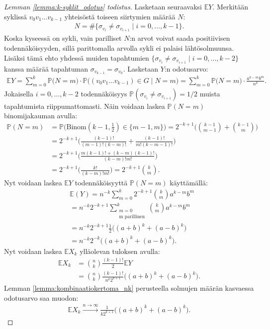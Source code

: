 \documentclass[finnish,12pt,a4paper,pdftex,sci,utf8]{aaltothesis}
\begin{document}
\begin{proof}[Lemman \ref{lemma:k-syklit_odotus} todistus]
	Lasketaan seuraavaksi $\mathbb{E} Y$. Merkitään syklissä $v_0 v_1 \ldots v_{k-1}$ yhteisöstä toiseen siirtymien määrää $N$:
	\begin{align*}
		N = \#\{\sigma_{v_i} \neq \sigma_{v_{i+1}} \mid i = 0, \ldots, k-1 \}.
	\end{align*}
	Koska kyseessä on sykli, vain parilliset $N$:n arvot voivat saada positiivisen todennäköisyyden, sillä parittomalla arvolla sykli ei palaisi lähtösolmuunsa. Lisäksi tämä ehto yhdessä muiden tapahtumien $\{\sigma_{v_i} \neq \sigma_{v_{i+1}} \mid i = 0, \ldots, k-2\}$ kanssa määrää tapahtuman $\sigma_{v_{k-1}} = \sigma_{v_0}$.
	Lasketaan $Y$:n odotusarvo:
	\begin{align*}
		\mathbb{E}Y = \sum^{k}_{m=0}\mathbb{P}\big(N=m\big) \cdot \mathbb{P}\big((v_0 v_1 \ldots v_{k-1}) \in G \mid N=m\big)
		= \sum^{k}_{m=0}\mathbb{P}\big(N=m\big) \cdot  \frac{a^{k-m}b^{m}}{n^{k}}.
	\end{align*}
	Jokaisella $i = 0, \ldots , k-2$ todennäköisyys $\mathbb{P}(\sigma_{v_i} \neq \sigma_{v_{i+1}}) = 1/2$ muista tapahtumista riippumattomasti. Näin voidaan laskea $\mathbb{P}(N = m)$ binomijakauman avulla:
	\begin{align*}
		\mathbb{P}(N = m) &= \mathbb{P}\big(\text{Binom}(k-1, \frac{1}{2}) \in \{m-1, m\}\big)
		= 2^{-k+1}\Bigg(\binom{k-1}{m-1} + \binom{k-1}{m}\Bigg) \\
		&= 2^{-k+1}\Bigg(\frac{(k-1)!}{(m-1)!(k-m)!} + \frac{(k-1)!}{m!(k-m-1)!}\Bigg) \\
		&= 2^{-k+1}\Bigg(\frac{m(k-1)! + (k-m)(k-1)!}{(k-m)!m!}\Bigg) \\
		&= 2^{-k+1}\Bigg(\frac{k!}{(k-m)!m!}\Bigg) = 2^{-k+1}\binom{k}{m}.
	\end{align*}
	Nyt voidaan laskea $\mathbb{E} Y$ todennäköisyyttä $\mathbb{P}(N = m)$ käyttämällä:
	\begin{align*}
		&\mathbb{E}(Y) = n^{-k} \sum^{k}_{m=0} 2^{-k+1}\binom{k}{m} a^{k-m}b^{m} \\
		&= n^{-k} 2^{-k+1} \sum_{\substack{m=0 \\ \text{m parillinen}}}^k \binom{k}{m}a^{k-m}b^{m} \\
		&= n^{-k} 2^{-k+1} \frac{1}{2} \big((a+b)^k + (a-b)^k \big) \\
		&= n^{-k} 2^{-k} \big((a+b)^k + (a-b)^k \big).
	\end{align*}
	Nyt voidaan laskea $\mathbb{E}X_k$ ylläolevan tuloksen avulla:
	\begin{align*}
		\mathbb{E}X_k &= \binom{n}{k}\frac{(k-1)!}{2} \mathbb{E}Y \\
		&= \binom{n}{k}\frac{(k-1)!}{n^{k} 2^{k+1}} \big((a+b)^k + (a-b)^k \big).
	\end{align*}
 	Lemman \ref{lemma:kombinaatiokertoma_nk} perusteella solmujen määrän kasvaessa odotusarvo saa muodon:
	\begin{align*}
		\mathbb{E}X_k \xrightarrow{n \rightarrow \infty} \frac{1}{k2^{k+1}} \big((a+b)^k + (a-b)^k \big).
	\end{align*}
\end{proof}
\end{document}
